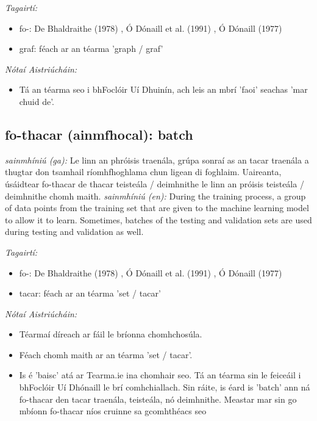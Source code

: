 \documentclass{article}
\begin{document}
 \noindent \textit{Tagairtí:}
\begin{itemize}
	\item fo-: De Bhaldraithe (1978) \cite{de-bhaldraithe}, Ó Dónaill et al. (1991) \cite{focloir-beag}, Ó Dónaill (1977) \cite{odonaill}
	\item graf: féach ar an téarma 'graph / graf'
\end{itemize}

 \noindent \textit{Nótaí Aistriúcháin:}
\begin{itemize}
	\item Tá an téarma seo i bhFoclóir Uí Dhuinín, ach leis an mbrí 'faoi' seachas 'mar chuid de'.
\end{itemize}


\subsection*{fo-thacar (ainmfhocal): batch} 
 \noindent \textit{sainmhíniú (ga):} Le linn an phróisis traenála, grúpa sonraí as an tacar traenála a thugtar don tsamhail ríomhfhoghlama chun ligean di foghlaim. Uaireanta, úsáidtear fo-thacar de thacar teisteála / deimhnithe le linn an próisis teisteála / deimhnithe chomh maith.
\newline\newline
 \noindent \textit{sainmhíniú (en):} During the training process, a group of data points from the training set that are given to the machine learning model to allow it to learn. Sometimes, batches of the testing and validation sets are used during testing and validation as well.
\newline

 \noindent \textit{Tagairtí:}
\begin{itemize}
	\item fo-: De Bhaldraithe (1978) \cite{de-bhaldraithe}, Ó Dónaill et al. (1991) \cite{focloir-beag}, Ó Dónaill (1977) \cite{odonaill}
	\item tacar: féach ar an téarma 'set / tacar'
\end{itemize}

 \noindent \textit{Nótaí Aistriúcháin:}
\begin{itemize}
	\item Téarmaí díreach ar fáil le bríonna chomhchosúla.
	\item Féach chomh maith ar an téarma 'set / tacar'.
	\item Is é 'baisc' atá ar Tearma.ie ina chomhair seo. Tá an téarma sin le feiceáil i bhFoclóir Uí Dhónaill le brí comhchiallach. Sin ráite, is éard is 'batch' ann ná fo-thacar den tacar traenála, teisteála, nó deimhnithe. Meastar mar sin go mbíonn fo-thacar níos cruinne sa gcomhthéacs seo
\end{itemize}
\end{document}
